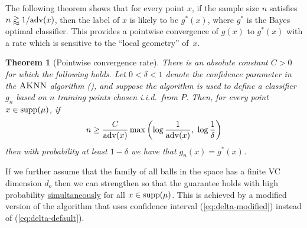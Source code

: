 \documentclass{article}
\def\supp{{\rm supp}}
\def\adv{{\rm adv}}
\newcommand{\algname}{\textsc{AKNN}}
\newtheorem{theorem}{Theorem}
\newcommand{\comment}[3]{{\color{#1} {\bf #2 :} #3}}
\newcommand{\new}[1]{\color{red} #1}
\newcommand{\shay}[1]{\comment{purple}{Shay}{#1}}
\begin{document}

{\new{The following theorem shows that for every point $x$,
if the sample size $n$ satisfies $n\gtrapprox 1/\adv(x)$,
then the label of $x$ is likely to be $g^*(x)$, where $g^*$ is the Bayes optimal classifier.
This provides a pointwise convergence of $g(x)$ to $g^*(x)$ with a rate which
is sensitive to the ``local geometry'' of~$x$.
}}

\begin{theorem}[Pointwise convergence rate]
There is an absolute constant $C > 0$ for which the following holds.
Let $0 < \delta < 1$ denote the confidence parameter in the $\algname$ algorithm (),
and suppose the algorithm is used to define a classifier $g_n$ based on $n$ training points chosen i.i.d.\ from $P$. 
Then, for every point $x\in\supp(\mu)$, if
\[n \geq \frac{C}{\adv(x)} \max \left( \log \frac{1}{\adv(x)}, \ \log \frac{1}{\delta} \right)\]
then with probability at least $1-\delta$ we have that $g_n(x)=g^*(x)$.
\label{thm:pointwise-rate}
\end{theorem}



{\new{If we further assume that the family of all balls in the space has a finite VC dimension $d_o$ then 
we can strengthen \Cref{thm:pointwise-rate} so that the guarantee holds with high probability \underline{simultaneously} for all $x\in \supp(\mu)$.
This is achieved by a modified version of the algorithm that uses confidence interval (\ref{eq:delta-modified}) instead of (\ref{eq:delta-default}).}}
\end{document}
